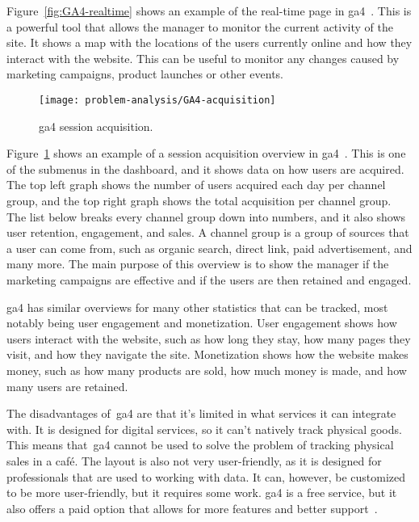 Figure~\ref{fig:GA4-realtime} shows an example of the real-time page in \acrshort{ga4}~\cite{ga4-realtime}.
This is a powerful tool that allows the manager to monitor the current activity of the site.
It shows a map with the locations of the users currently online and how they interact with the website.
This can be useful to monitor any changes caused by marketing campaigns, product launches or other events.

\begin{figure}[H]
    \centering
    \texttt{[image: problem-analysis/GA4-acquisition]}
    \caption{\acrshort{ga4} session acquisition.
    }\label{fig:GA4-acquisition}
\end{figure}

Figure~\ref{fig:GA4-acquisition} shows an example of a session acquisition overview in \acrshort{ga4}~\cite{ga4-tips}.
This is one of the submenus in the dashboard, and it shows data on how users are acquired.
The top left graph shows the number of users acquired each day per channel group, and the top right graph shows the
total acquisition per channel group.
The list below breaks every channel group down into numbers, and it also shows user retention, engagement, and sales.
A channel group is a group of sources that a user can come from, such as organic search, direct link, paid
advertisement, and many more.
The main purpose of this overview is to show the manager if the marketing campaigns are effective and if the users are
then retained and engaged.

\acrshort{ga4} has similar overviews for many other statistics that can be tracked, most notably being user engagement
and monetization.
User engagement shows how users interact with the website, such as how long they stay, how many pages they visit, and
how they navigate the site.
Monetization shows how the website makes money, such as how many products are sold, how much money is made, and how
many users are retained.

The disadvantages of~\acrlong{ga4} are that it's limited in what services it can integrate with.
It is designed for digital services, so it can't natively track physical goods.
This means that~\acrshort{ga4} cannot be used to solve the problem of tracking physical sales in a café.
The layout is also not very user-friendly, as it is designed for professionals that are used to working with data.
It can, however, be customized to be more user-friendly, but it requires some work.
\acrshort{ga4} is a free service, but it also offers a paid option that allows for more features and better
support~\cite{ga4-360}.
